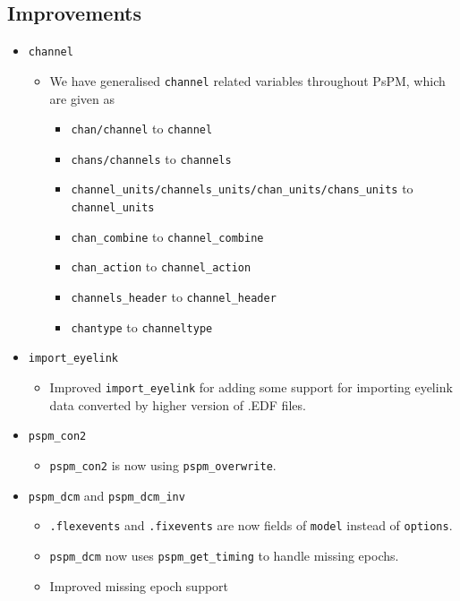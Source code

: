 \documentclass[english]{article}
\numberwithin{equation}{section}
\numberwithin{figure}{section}
\begin{document}
\subsection*{Improvements}
    \begin{itemize}
    	\item \texttt{channel}
    	\begin{itemize}
    		\item We have generalised \texttt{channel} related variables throughout PsPM, which are given as 
    		\begin{itemize}
    			\item \texttt{chan/channel} to \texttt{channel}
    			\item \texttt{chans/channels} to \texttt{channels}
    			\item \texttt{channel\_units/channels\_units/chan\_units/chans\_units} to \texttt{channel\_units}
    			\item \texttt{chan\_combine} to \texttt{channel\_combine}
    			\item \texttt{chan\_action} to \texttt{channel\_action}
    			\item \texttt{channels\_header} to \texttt{channel\_header}
    			\item \texttt{chantype} to \texttt{channeltype}
    		\end{itemize}
			\end{itemize}
    	\item \texttt{import\_eyelink}
    	\begin{itemize}
    		\item Improved \texttt{import\_eyelink} for adding some support for importing eyelink data converted by higher version of .EDF files.
    	\end{itemize}
    	\item \texttt{pspm\_con2}
    	\begin{itemize}
    		\item \texttt{pspm\_con2} is now using \texttt{pspm\_overwrite}.
    	\end{itemize}
    	\item \texttt{pspm\_dcm} and \texttt{pspm\_dcm\_inv}
    	\begin{itemize}
    		\item \texttt{.flexevents} and \texttt{.fixevents} are now fields of \texttt{model} instead of \texttt{options}.
    		\item \texttt{pspm\_dcm} now uses \texttt{pspm\_get\_timing} to handle missing epochs.
    		\item Improved missing epoch support

\end{itemize}
\end{itemize}
\end{document}
